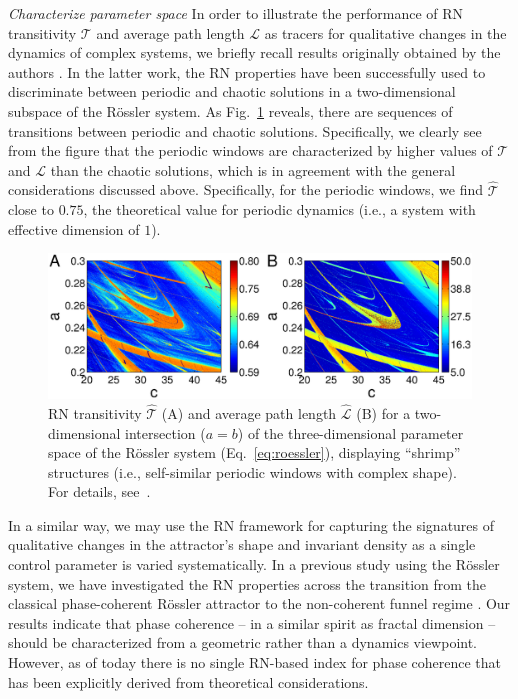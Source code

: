 		
		\emph{Characterize parameter space} 
		In order to illustrate the performance of RN transitivity ${\mathcal{T}}$ and average path length ${\mathcal{L}}$ as tracers for qualitative changes in the dynamics of complex systems, we briefly recall results originally obtained by the authors \cite{Zou2010}. In the latter work, the RN properties have been successfully used to discriminate between periodic and chaotic solutions in a two-dimensional subspace of the R\"ossler system. As Fig.~\ref{fig:roessler_shrimp} reveals, there are sequences of transitions between periodic and chaotic solutions. Specifically, we clearly see from the figure that the periodic windows are characterized by higher values of ${\mathcal{T}}$ and ${\mathcal{L}}$ than the chaotic solutions, which is in agreement with the general considerations discussed above. Specifically, for the periodic windows, we find $\hat{\mathcal{T}}$ close to $0.75$, the theoretical value for periodic dynamics (i.e., a system with effective dimension of $1$).
		\begin{figure}
		\centering
			\includegraphics[width=\columnwidth]{Chapter07_Applications/ros_shrimp_eBook.eps} 
\caption{RN transitivity $\hat{\mathcal{T}}$ (A) and average path length $\hat{\mathcal{L}}$ (B) for a two-dimensional intersection ($a=b$) of the three-dimensional parameter space of the R\"ossler system (Eq.~\ref{eq:roessler}), displaying ``shrimp'' structures (i.e., self-similar periodic windows with complex shape). For details, see~\cite{Zou2010}.}
\label{fig:roessler_shrimp}
\end{figure}

		In a similar way, we may use the RN framework for capturing the signatures of qualitative changes in the attractor's shape and invariant density as a single control parameter is varied systematically. In a previous study using the R\"ossler system, we have investigated the RN properties across the transition from the classical phase-coherent R\"ossler attractor to the non-coherent funnel regime \cite{Zou2012c}. Our results indicate that phase coherence -- in a similar spirit as fractal dimension -- should be characterized from a geometric rather than a dynamics viewpoint. However, as of today there is no single RN-based index for phase coherence that has been explicitly derived from theoretical considerations.
		
